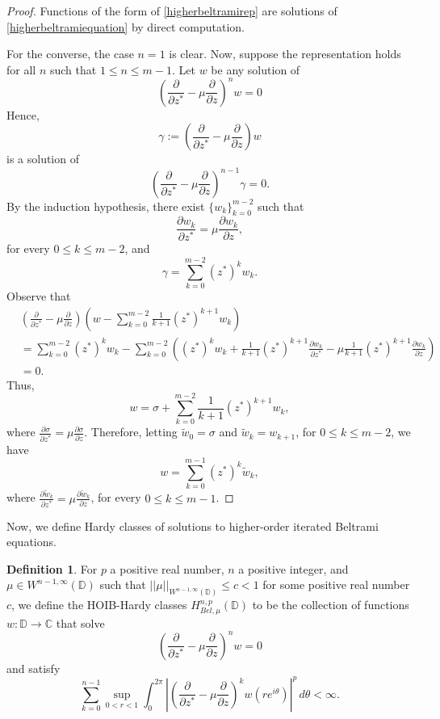\documentclass[12pt,reqno]{amsart}
\theoremstyle{definition}
\newtheorem{deff}[theorem]{Definition}
\theoremstyle{remark}
\newcommand{\C}{\mathbb C}
\newcommand{\p}{\partial}
\newcommand{\disk}{\mathbb{D}}
\begin{document}
\begin{proof}
    Functions of the form of \eqref{higherbeltramirep} are solutions of \eqref{higherbeltramiequation} by direct computation. 

    For the converse, the case $n = 1$ is clear. Now, suppose the representation holds for all $n$ such that $1 \leq n \leq m-1$. Let $w$ be any solution of 
    \[
        \left( \frac{\p }{\p z^*} - \mu\frac{\p}{\p z} \right)^n w  = 0
    \]
    Hence, 
    \[
        \gamma:= \left( \frac{\p }{\p z^*} - \mu\frac{\p}{\p z} \right) w
    \]
    is a solution of 
    \[
        \left( \frac{\p }{\p z^*} - \mu\frac{\p}{\p z} \right)^{n-1} \gamma = 0.
    \]
    By the induction hypothesis, there exist $\{w_k\}_{k=0}^{m-2}$ such that 
    \[
        \frac{\p w_k}{\p  z^*} = \mu \frac{\p w_k}{\p z},
    \]
    for every $0 \leq k \leq m-2$, and 
    \[
        \gamma = \sum_{k=0}^{m-2}  (z^*)^k w_k.
    \]
    Observe that 
    \begin{align*}
        &\left( \frac{\p }{\p z^*} - \mu\frac{\p }{\p z}\right)\left( w - \sum_{k=0}^{m-2} \frac{1}{k+1} (z^*)^{k+1} w_k \right) \\
        &= \sum_{k=0}^{m-2}  (z^*)^k w_k - \sum_{k=0}^{m-2} \left(  (z^*)^k w_k  + \frac{1}{k+1}  (z^*)^{k+1} \frac{\p w_k}{\p z^*} - \mu\frac{1}{k+1} (z^*)^{k+1} \frac{\p w_k}{\p z}\right)\\
        &= 0.
    \end{align*}
    Thus, 
    \[
        w = \sigma +  \sum_{k=0}^{m-2} \frac{1}{k+1} (z^*)^{k+1} w_k,
    \]
    where $\frac{\p \sigma}{\p  z^*} = \mu \frac{\p \sigma}{\p z}$. Therefore, letting $\tilde{w}_0 = \sigma$ and $\tilde{w}_{k} = w_{k+1}$, for $0 \leq k \leq m-2$, we have
    \[
        w = \sum_{k=0}^{m-1}  (z^*)^k \tilde{w}_k,
    \]
    where $\frac{\p \tilde{w}_k}{\p  z^*} = \mu \frac{\p \tilde{w}_k}{\p z}$, for every $0 \leq k \leq m-1$. 
\end{proof}

Now, we define Hardy classes of solutions to higher-order iterated Beltrami equations.

\begin{deff}
    For $p$ a positive real number, $n$ a positive integer, and $\mu \in W^{n-1,\infty}(\disk)$ such that $||\mu||_{W^{n-1,\infty}(\disk)}\leq c < 1$ for some positive real number $c$, we define the HOIB-Hardy classes $H^{n,p}_{Bel,\mu}(\disk)$ to be the collection of functions $w:\disk\to\C$ that solve
    \[
        \left( \frac{\p }{\p z^*} - \mu\frac{\p}{\p z} \right)^n w  = 0
    \]
    and satisfy
    \[
        \sum_{k=0}^{n-1} \sup_{0 < r< 1}\int_0^{2\pi} \left|\left(\frac{\p}{\p  z^*} - \mu\frac{\p}{\p z}\right)^k w(re^{i\theta})\right|^p\,d\theta < \infty.
    \]
\end{deff}
\end{document}
